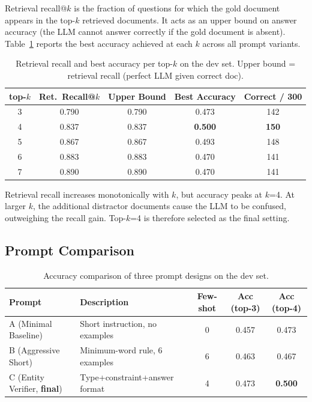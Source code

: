 \documentclass[11pt,a4paper]{article}
\begin{document}
Retrieval recall@$k$ is the fraction of questions for which the gold document appears in the top-$k$ retrieved documents. It acts as an upper bound on answer accuracy (the LLM cannot answer correctly if the gold document is absent). Table~\ref{tab:topk} reports the best accuracy achieved at each $k$ across all prompt variants.

\begin{table}[h]
\centering
\begin{tabular}{ccccc}
\toprule
\textbf{top-$k$} & \textbf{Ret.\ Recall@$k$} & \textbf{Upper Bound} & \textbf{Best Accuracy} & \textbf{Correct / 300} \\
\midrule
3 & 0.790 & 0.790 & 0.473 & 142 \\
4 & 0.837 & 0.837 & \textbf{0.500} & \textbf{150} \\
5 & 0.867 & 0.867 & 0.493 & 148 \\
6 & 0.883 & 0.883 & 0.470 & 141 \\
7 & 0.890 & 0.890 & 0.470 & 141 \\
\bottomrule
\end{tabular}
\caption{Retrieval recall and best accuracy per top-$k$ on the dev set. Upper bound = retrieval recall (perfect LLM given correct doc).}
\label{tab:topk}
\end{table}

Retrieval recall increases monotonically with $k$, but accuracy peaks at $k$=4. At larger $k$, the additional distractor documents cause the LLM to be confused, outweighing the recall gain. Top-$k$=4 is therefore selected as the final setting.

\subsection{Prompt Comparison}

\begin{table}[h]
\centering
\begin{tabular}{llccc}
\toprule
\textbf{Prompt} & \textbf{Description} & \textbf{Few-shot} & \textbf{Acc (top-3)} & \textbf{Acc (top-4)} \\
\midrule
A (Minimal Baseline)         & Short instruction, no examples  & 0 & 0.457 & 0.473 \\
B (Aggressive Short)         & Minimum-word rule, 6 examples   & 6 & 0.463 & 0.467 \\
C (Entity Verifier, \textbf{final}) & Type+constraint+answer format & 4 & 0.473 & \textbf{0.500} \\
\bottomrule
\end{tabular}
\caption{Accuracy comparison of three prompt designs on the dev set.}
\end{table}
\end{document}

